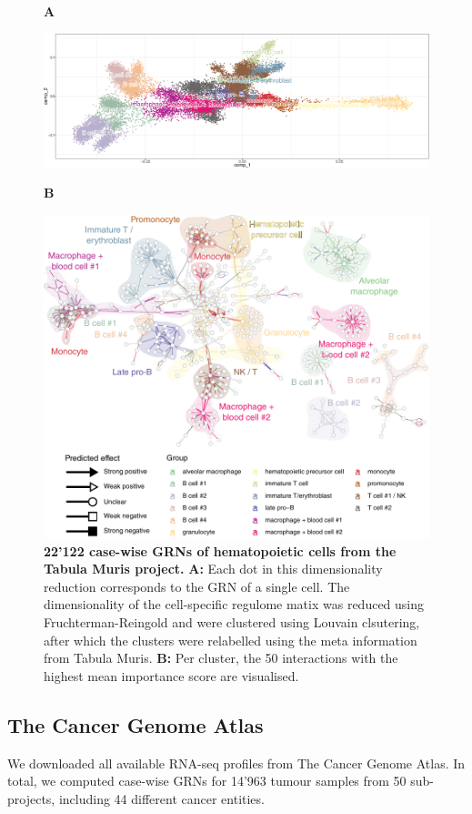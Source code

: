 \begin{figure}[htb!]
	{\raggedright\textbf{A}}
	\begin{center}\includegraphics[width=\linewidth]{fig/tabula_muris_hema/plot_fr_cropped.png}\end{center}
	{\raggedright\textbf{B}}
	\begin{center}\includegraphics[width=.9\linewidth]{fig/tabula_muris_hema/grouped_interactions.pdf}\end{center}
	\caption{
		\textbf{22'122 case-wise GRNs of hematopoietic cells from the Tabula Muris project.}
		\textbf{A:} Each dot in this dimensionality reduction corresponds to the GRN of a single cell. The dimensionality of the cell-specific regulome matix was reduced using Fruchterman-Reingold and were clustered using Louvain clsutering, after which the clusters were relabelled using the meta information from Tabula Muris.
		\textbf{B:} Per cluster, the 50 interactions with the highest mean importance score are visualised.
	}
	\label{fig:tabmur}
\end{figure}

\subsection{The Cancer Genome Atlas}
We downloaded all available RNA-seq profiles from The Cancer Genome Atlas. In total, we computed case-wise GRNs for 14'963 tumour samples from 50 sub-projects, including 44 different cancer entities. 

